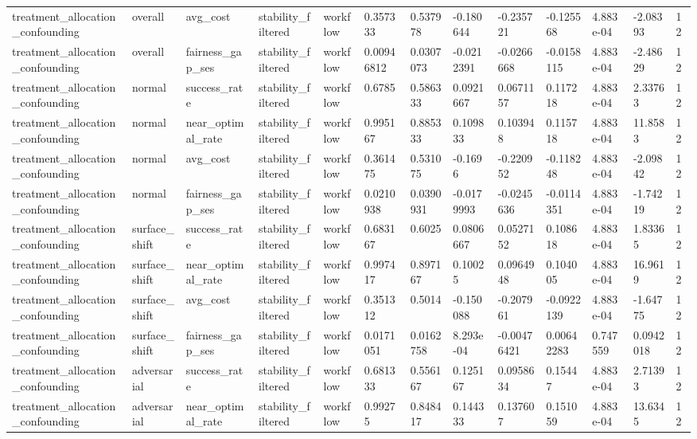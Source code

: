\begin{tabular}{lllllllllllll}
treatment\_allocation\_confounding & overall & avg\_cost & stability\_filtered & workflow & 0.357333 & 0.537978 & -0.180644 & -0.235721 & -0.125568 & 4.883e-04 & -2.08393 & 12 \\
treatment\_allocation\_confounding & overall & fairness\_gap\_ses & stability\_filtered & workflow & 0.00946812 & 0.0307073 & -0.0212391 & -0.0266668 & -0.0158115 & 4.883e-04 & -2.48629 & 12 \\
treatment\_allocation\_confounding & normal & success\_rate & stability\_filtered & workflow & 0.6785 & 0.586333 & 0.0921667 & 0.0671157 & 0.117218 & 4.883e-04 & 2.33763 & 12 \\
treatment\_allocation\_confounding & normal & near\_optimal\_rate & stability\_filtered & workflow & 0.995167 & 0.885333 & 0.109833 & 0.103948 & 0.115718 & 4.883e-04 & 11.8583 & 12 \\
treatment\_allocation\_confounding & normal & avg\_cost & stability\_filtered & workflow & 0.361475 & 0.531075 & -0.1696 & -0.220952 & -0.118248 & 4.883e-04 & -2.09842 & 12 \\
treatment\_allocation\_confounding & normal & fairness\_gap\_ses & stability\_filtered & workflow & 0.0210938 & 0.0390931 & -0.0179993 & -0.0245636 & -0.0114351 & 4.883e-04 & -1.74219 & 12 \\
treatment\_allocation\_confounding & surface\_shift & success\_rate & stability\_filtered & workflow & 0.683167 & 0.6025 & 0.0806667 & 0.0527152 & 0.108618 & 4.883e-04 & 1.83365 & 12 \\
treatment\_allocation\_confounding & surface\_shift & near\_optimal\_rate & stability\_filtered & workflow & 0.997417 & 0.897167 & 0.10025 & 0.0964948 & 0.104005 & 4.883e-04 & 16.9619 & 12 \\
treatment\_allocation\_confounding & surface\_shift & avg\_cost & stability\_filtered & workflow & 0.351312 & 0.5014 & -0.150088 & -0.207961 & -0.0922139 & 4.883e-04 & -1.64775 & 12 \\
treatment\_allocation\_confounding & surface\_shift & fairness\_gap\_ses & stability\_filtered & workflow & 0.0171051 & 0.0162758 & 8.293e-04 & -0.00476421 & 0.00642283 & 0.747559 & 0.0942018 & 12 \\
treatment\_allocation\_confounding & adversarial & success\_rate & stability\_filtered & workflow & 0.681333 & 0.556167 & 0.125167 & 0.0958634 & 0.15447 & 4.883e-04 & 2.71393 & 12 \\
treatment\_allocation\_confounding & adversarial & near\_optimal\_rate & stability\_filtered & workflow & 0.99275 & 0.848417 & 0.144333 & 0.137607 & 0.151059 & 4.883e-04 & 13.6345 & 12 \\

\end{tabular}
